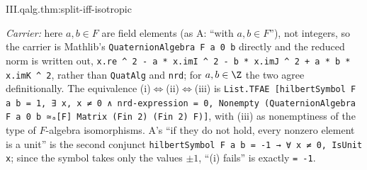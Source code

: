 \begin{theorem}
\end{theorem}
\begin{tfformal}{III.qalg.thm:split-iff-isotropic}
\begin{tffidelity}
\emph{Carrier:} here $a,b\in F$ are field elements (as A: ``with $a,b\in F$''), not integers, so the carrier is Mathlib's \texttt{QuaternionAlgebra F a 0 b} directly and the reduced norm is written out, \texttt{x.re \textasciicircum{} 2 - a * x.imI \textasciicircum{} 2 - b * x.imJ \textasciicircum{} 2 + a * b * x.imK \textasciicircum{} 2}, rather than \texttt{QuatAlg} and \texttt{nrd}; for $a,b\in\Z$ the two agree definitionally. The equivalence (i)$\iff$(ii)$\iff$(iii) is \texttt{List.TFAE [hilbertSymbol F a b = 1, ∃ x, x ≠ 0 ∧ nrd-expression = 0, Nonempty (QuaternionAlgebra F a 0 b ≃ₐ[F] Matrix (Fin 2) (Fin 2) F)]}, with (iii) as nonemptiness of the type of $F$-algebra isomorphisms. A's ``if they do not hold, every nonzero element is a unit'' is the second conjunct \texttt{hilbertSymbol F a b = -1 → ∀ x ≠ 0, IsUnit x}; since the symbol takes only the values $\pm1$, ``(i) fails'' is exactly \texttt{= -1}.
\end{tffidelity}
\end{tfformal}
